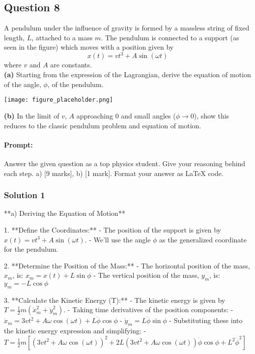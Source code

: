 \documentclass{article}
\begin{document}
\subsection{Question 8}

A pendulum under the influence of gravity is formed by a massless string of fixed length, $L$, attached to a mass $m$. The pendulum is connected to a support (as seen in the figure) which moves with a position given by
\[
x(t) = vt^3 + A\sin(\omega t)
\]
where $v$ and $A$ are constants. \\

\textbf{(a)} Starting from the expression of the Lagrangian, derive the equation of motion of the angle, $\phi$, of the pendulum.

\begin{center}
\texttt{[image: figure\_placeholder.png]}
\end{center}

\textbf{(b)} In the limit of $v$, $A$ approaching 0 and small angles ($\phi \to 0$), show this reduces to the classic pendulum problem and equation of motion.

\paragraph{Prompt: \\} 
Answer the given question as a top physics student. Give your reasoning behind each step. a) [9 marks], b) [1 mark].
Format your answer as LaTeX code.

\subsubsection{Solution 1}
**a) Deriving the Equation of Motion**

1. **Define the Coordinates:**
   - The position of the support is given by  $x(t) = vt^3 + A\sin(\omega t)$.
   - We'll use the angle $\phi$  as the generalized coordinate for the pendulum.

2. **Determine the Position of the Mass:**
   - The horizontal position of the mass, $x_m$, is: $x_m = x(t) + L \sin \phi$
   - The vertical position of the mass, $y_m$, is: $y_m = -L \cos \phi$

3. **Calculate the Kinetic Energy (T):**
   - The kinetic energy is given by $T = \frac{1}{2}m(\dot{x}_m^2 + \dot{y}_m^2)$.
   - Taking time derivatives of the position components:
     - $\dot{x}_m = 3vt^2 + A\omega \cos(\omega t) + L \dot{\phi} \cos \phi$
     - $\dot{y}_m = L \dot{\phi} \sin \phi$
   - Substituting these into the kinetic energy expression and simplifying:
     - $T = \frac{1}{2}m \left[ (3vt^2 + A\omega \cos(\omega t))^2 + 2L(3vt^2 + A\omega \cos(\omega t))\dot{\phi}\cos \phi + L^2 \dot{\phi}^2 \right] $
\end{document}
